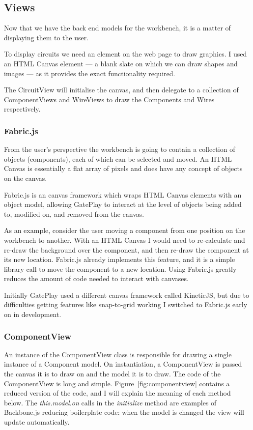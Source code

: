\subsection{Views}
Now that we have the back end models for the workbench, it is a matter of displaying them to the user.

To display circuits we need an element on the web page to draw graphics. I used an HTML Canvas element --- a blank slate on which we can draw shapes and images --- as it provides the exact functionality required.

The CircuitView will initialise the canvas, and then delegate to a collection of ComponentViews and WireViews to draw the Components and Wires respectively.

\subsubsection{Fabric.js}
From the user's perspective the workbench is going to contain a collection of objects (components), each of which can be selected and moved. An HTML Canvas is essentially a flat array of pixels and does have any concept of objects on the canvas.

Fabric.js is an canvas framework which wraps HTML Canvas elements with an object model, allowing GatePlay to interact at the level of objects being added to, modified on, and removed from the canvas.

As an example, consider the user moving a component from one position on the workbench to another. With an HTML Canvas I would need to re-calculate and re-draw the background over the component, and then re-draw the component at its new location. Fabric.js already implements this feature, and it is a simple library call to move the component to a new location. Using Fabric.js greatly reduces the amount of code needed to interact with canvases.

Initially GatePlay used a different canvas framework called KineticJS, but due to difficulties getting features like snap-to-grid working I switched to Fabric.js early on in development.

\subsubsection{ComponentView}
An instance of the ComponentView class is responsible for drawing a single instance of a Component model. On instantiation, a ComponentView is passed the canvas it is to draw on and the model it is to draw. The code of the ComponentView is long and simple. Figure~\ref{fig:componentview} contains a reduced version of the code, and I will explain the meaning of each method below. The \textit{this.model.on} calls in the \textit{initialize} method are examples of Backbone.js reducing boilerplate code: when the model is changed the view will update automatically.


